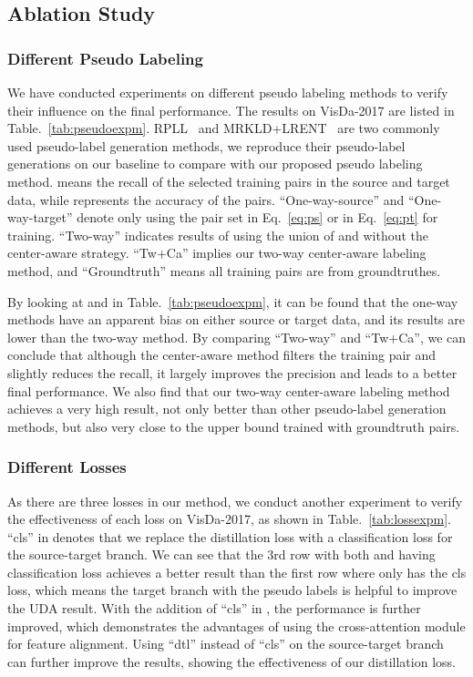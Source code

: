 \documentclass[dvipsnames, svgnames, x11names, table]{article} \usepackage{iclr2022_conference,times}
\begin{document}
\begin{spacing}{1.0}
\subsection{Ablation Study}


\subsubsection{Different Pseudo Labeling}
We have conducted experiments on different pseudo labeling methods to verify their influence on the final performance.
The results on VisDa-2017 are listed in Table.~\ref{tab:pseudoexpm}.
RPLL~\citep{zheng2021rectifying} and MRKLD+LRENT~\citep{zou2019confidence} are two commonly used pseudo-label generation methods, we reproduce their pseudo-label generations on our baseline to compare with our proposed pseudo labeling method.
 means the recall of the selected training pairs in the source and target data, while  represents the accuracy of the pairs. 
``One-way-source'' and ``One-way-target'' denote only using the pair set  in Eq.~\ref{eq:ps} or  in Eq.~\ref{eq:pt} for training. ``Two-way'' indicates results of using the union of  and  without the center-aware strategy. ``Tw+Ca'' implies our two-way center-aware labeling method, and
``Groundtruth'' means all training pairs are from groundtruthes.

By looking at  and  in Table.~\ref{tab:pseudoexpm}, it can be found that the one-way methods have an apparent bias on either source or target data, and its results are lower than the two-way method. By comparing ``Two-way'' and ``Tw+Ca'', we can conclude that although the center-aware method filters the training pair and slightly reduces the recall, it largely improves the precision and leads to a better final performance. We also find that our two-way center-aware labeling method achieves a very high result, not only better than other pseudo-label generation methods, but also very close to the upper bound trained with groundtruth pairs.

\subsubsection{Different Losses}
As there are three losses in our method, we conduct another experiment to verify the effectiveness of each loss on VisDa-2017, as shown in Table.~\ref{tab:lossexpm}. 
``cls'' in  denotes that we replace the distillation loss with a classification loss for the source-target branch.
We can see that the 3rd row with both  and  having classification loss achieves a better result than the first row where only  has the cls loss, which means the target branch with the pseudo labels is helpful to improve the UDA result. With the addition of ``cls'' in , the performance is further improved, which demonstrates the advantages of using the cross-attention module for feature alignment. Using ``dtl'' instead of ``cls'' on the source-target branch can further improve the results, showing the effectiveness of our distillation loss.


\end{spacing}
\end{document}
